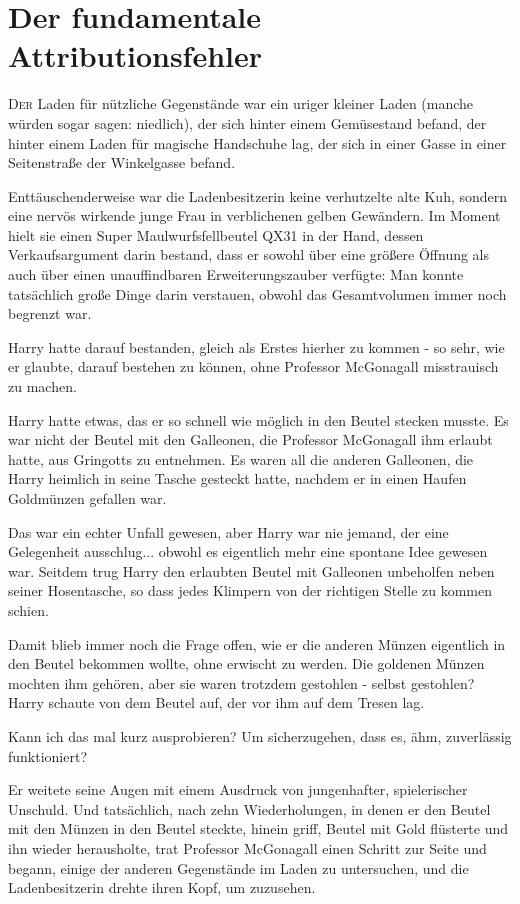 \chapter{Der fundamentale Attributionsfehler}

\lettrine{D}{er} Laden für nützliche Gegenstände war ein uriger kleiner Laden (manche
würden sogar sagen: niedlich), der sich hinter einem Gemüsestand befand, der hinter einem Laden für magische Handschuhe
lag, der sich in einer Gasse in einer Seitenstraße der Winkelgasse befand.

Enttäuschenderweise war die
Ladenbesitzerin keine verhutzelte alte Kuh, sondern eine nervös wirkende junge Frau in verblichenen gelben Gewändern. Im
Moment hielt sie einen Super Maulwurfsfellbeutel QX31 in der Hand, dessen Verkaufsargument darin bestand, dass er sowohl
über eine größere Öffnung als auch über einen unauffindbaren Erweiterungszauber verfügte: Man konnte tatsächlich große
Dinge darin verstauen, obwohl das Gesamtvolumen immer noch begrenzt war.

Harry hatte darauf bestanden, gleich
als Erstes hierher zu kommen - so sehr, wie er glaubte, darauf bestehen zu können, ohne Professor McGonagall
misstrauisch zu machen.

Harry hatte etwas, das er so schnell wie möglich in den Beutel stecken musste. Es
war nicht der Beutel mit den Galleonen, die Professor McGonagall ihm erlaubt hatte, aus Gringotts zu entnehmen. Es waren
all die anderen Galleonen, die Harry heimlich in seine Tasche gesteckt hatte, nachdem er in einen Haufen Goldmünzen
gefallen war.

Das war ein echter Unfall gewesen, aber Harry war nie jemand, der eine Gelegenheit ausschlug...
obwohl es eigentlich mehr eine spontane Idee gewesen war. Seitdem trug Harry den erlaubten Beutel mit Galleonen
unbeholfen neben seiner Hosentasche, so dass jedes Klimpern von der richtigen Stelle zu kommen schien.

Damit
blieb immer noch die Frage offen, wie er die anderen Münzen eigentlich in den Beutel bekommen wollte, ohne erwischt zu
werden. Die goldenen Münzen mochten ihm gehören, aber sie waren trotzdem gestohlen - selbst gestohlen? Harry schaute von
dem Beutel auf, der vor ihm auf dem Tresen lag.

\glqq Kann ich das mal kurz ausprobieren? Um sicherzugehen,
dass es, ähm, zuverlässig funktioniert?\grqq{}

Er weitete seine Augen mit einem Ausdruck von jungenhafter,
spielerischer Unschuld. Und tatsächlich, nach zehn Wiederholungen, in denen er den Beutel mit den Münzen in den Beutel
steckte, hinein griff,
\glqq Beutel mit Gold\grqq{} flüsterte
und ihn wieder herausholte, trat Professor
McGonagall einen Schritt zur Seite und begann, einige der anderen Gegenstände im Laden zu untersuchen, und die
Ladenbesitzerin drehte ihren Kopf, um zuzusehen.

